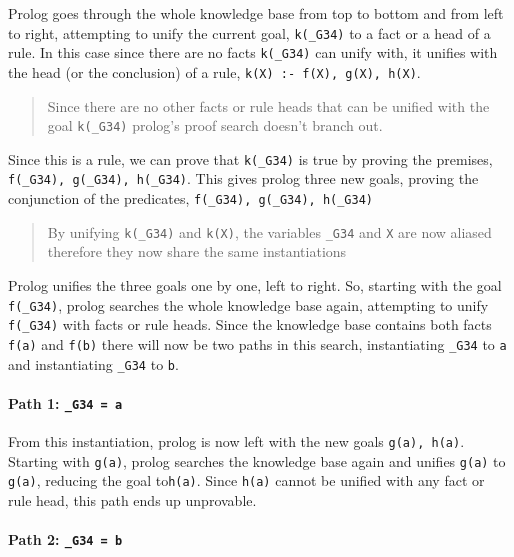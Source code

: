 Prolog goes through the whole knowledge base from top to bottom and from
left to right, attempting to unify the current goal, \texttt{k(\_G34)}
to a fact or a head of a rule. In this case since there are no facts
\texttt{k(\_G34)} can unify with, it unifies with the head (or the
conclusion) of a rule, \texttt{k(X)\ :-\ f(X),\ g(X),\ h(X)}.

\begin{quote}
Since there are no other facts or rule heads that can be unified with
the goal \texttt{k(\_G34)} prolog's proof search doesn't branch out.
\end{quote}

Since this is a rule, we can prove that \texttt{k(\_G34)} is true by
proving the premises, \texttt{f(\_G34),\ g(\_G34),\ h(\_G34)}. This
gives prolog three new goals, proving the conjunction of the predicates,
\texttt{f(\_G34),\ g(\_G34),\ h(\_G34)}

\begin{quote}
By unifying \texttt{k(\_G34)} and \texttt{k(X)}, the variables
\texttt{\_G34} and \texttt{X} are now aliased therefore they now share
the same instantiations
\end{quote}

Prolog unifies the three goals one by one, left to right. So, starting
with the goal \texttt{f(\_G34)}, prolog searches the whole knowledge
base again, attempting to unify \texttt{f(\_G34)} with facts or rule
heads. Since the knowledge base contains both facts \texttt{f(a)} and
\texttt{f(b)} there will now be two paths in this search, instantiating
\texttt{\_G34} to \texttt{a} and instantiating \texttt{\_G34} to
\texttt{b}.

\paragraph{\texorpdfstring{Path 1:
\texttt{\_G34\ =\ a}}{Path 1: \_G34 = a}}\label{logic-programming-paradigm.md__path-1-_g34-a}

From this instantiation, prolog is now left with the new goals
\texttt{g(a),\ h(a)}. Starting with \texttt{g(a)}, prolog searches the
knowledge base again and unifies \texttt{g(a)} to \texttt{g(a)},
reducing the goal to\texttt{h(a)}. Since \texttt{h(a)} cannot be unified
with any fact or rule head, this path ends up unprovable.

\paragraph{\texorpdfstring{Path 2:
\texttt{\_G34\ =\ b}}{Path 2: \_G34 = b}}\label{logic-programming-paradigm.md__path-2-_g34-b}

